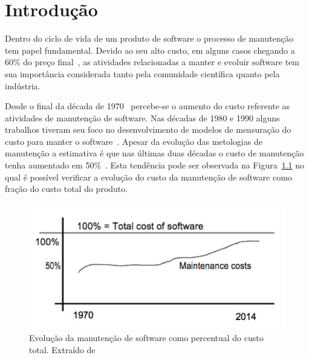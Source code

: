 \chapter{Introdução}
\label{ch:intro}

Dentro do ciclo de vida de um produto de software o processo de manutenção tem
papel fundamental. Devido ao seu alto custo, em alguns casos chegando a 60\% do
preço final~\cite{kaur2015review}, as atividades relacionadas a manter e evoluir
software tem sua importância considerada tanto pela comunidade científica quanto
pela indústria.

Desde o final da década de 1970~\cite{Zelkowitz:1979:PSE:578504} percebe-se o
aumento do custo referente as atividades de  manutenção de software. Nas décadas
de 1980 e 1990 alguns trabalhos tiveram seu foco no desenvolvimento de modelos
de mensuração do custo para manter o
software~\cite{Herrin:1985:SMC:323287.323383,hirota1994approach}. Apesar da
evolução das metologias de manutenção a estimativa é que nas últimas duas
décadas o custo de manutenção tenha aumentado em
50\%~\cite{koskinen2010software}. Esta tendência pode ser observada na
Figura~\ref{fig:software-maintence-costs} no qual é possível verificar a
evolução do custo da manutenção de software como fração do custo total do
produto.

\begin{figure}
\centering
\includegraphics[width=0.7\linewidth]{./chapter-intro/img/software-maintence-costs}
\caption{Evolução da manutenção de software como percentual do custo total.
	Extraído de~\cite{engelbertink2010save}}
\label{fig:software-maintence-costs}
\end{figure}

